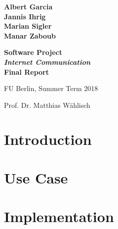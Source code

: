 \documentclass[11pt,paper=a4,parskip=half]{scrartcl}
\begin{document}
\thispagestyle{empty}


\begin{center}

\begin{spacing}{1.2}
\textbf{ \LARGE
Albert Garcia \\
Jannis Ihrig \\
Marian Sigler \\
Manar Zaboub \\
}

\end{spacing}\vspace{2.5em}


\textbf{ \Huge Software Project \\ \emph{Internet Communication} \\\vspace{0.8em}
Final Report}
\vspace{2.5em}

\begin{spacing}{1}
\Large

FU Berlin, Summer Term 2018

Prof. Dr. Matthias Wählisch
\end{spacing}
\end{center}

\vspace{10mm}


\setcounter{tocdepth}{2}
\tableofcontents

\newpage



\section{Introduction}







\section{Use Case}






\section{Implementation}
\end{document}
